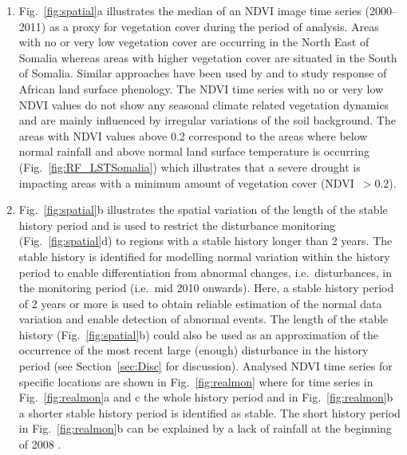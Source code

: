\documentclass[authoryear,preprint,review,10pt]{elsarticle}
\begin{document}
\begin{enumerate}[(1)]

\item Fig.~\ref{fig:spatial}a illustrates the median of an NDVI image time series (2000--2011) as a proxy for vegetation cover during the period of
analysis. Areas with no or very low vegetation cover are occurring in the North East of Somalia whereas areas with higher vegetation cover are situated in
the South of Somalia. Similar approaches have been used by \citet{Brown:2010fq} and \citet{Vrieling:2011da} to study response of African land surface
phenology. The NDVI time series with no or very low NDVI values do not show any seasonal climate related vegetation dynamics and are mainly influenced by
irregular variations of the soil background. The areas with NDVI values above 0.2 correspond to the areas where below normal rainfall and above normal land
surface temperature is occurring (Fig.~\ref{fig:RF_LSTSomalia}) which illustrates that a severe drought is impacting areas with a minimum amount of vegetation cover (NDVI~$> 0.2$). 

\item Fig.~\ref{fig:spatial}b illustrates the spatial variation of the length of the stable history period and is used to restrict the disturbance monitoring (Fig.~\ref{fig:spatial}d) to regions
with a stable history longer than 2 years. The stable history is identified for modelling normal variation within the history period to enable
differentiation from abnormal changes, i.e.\ disturbances, in the monitoring period (i.e.\ mid 2010 onwards). Here, a stable history period of 2 years or more is used to obtain reliable estimation of the normal data variation and enable detection of abnormal events. The length of the stable history (Fig.~\ref{fig:spatial}b) could also be used as an approximation of the occurrence of the most recent large (enough) disturbance in the history period (see Section~\ref{sec:Disc} for discussion). Analysed NDVI time series for specific locations are shown in Fig.~\ref{fig:realmon} where for time series in Fig.~\ref{fig:realmon}a and c the whole history period and in Fig.~\ref{fig:realmon}b a shorter stable history period is identified as stable. The short history period in Fig.~\ref{fig:realmon}b can be explained by a lack of rainfall at the beginning of 2008 \citep{Funk:2009vf}. 

\end{enumerate}
\end{document}
